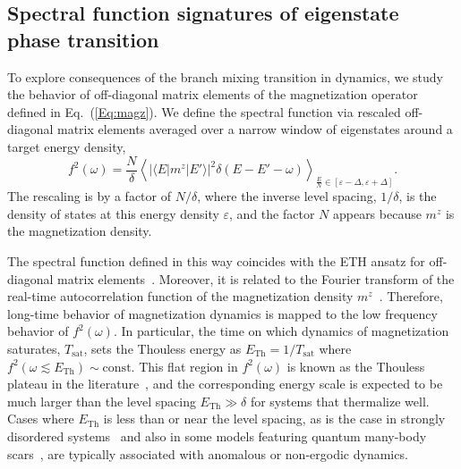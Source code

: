 \documentclass[aps,prx,showpacs,amsmath,amssymb,superscriptaddress,twocolumn,longbibliography,10pt,nofootinbib]{revtex4-2}
\begin{document}
\subsection{Spectral function signatures of eigenstate phase transition \label{Sec:spec}}
To explore consequences of the branch mixing transition in dynamics, we study the behavior of off-diagonal matrix elements of the magnetization operator defined in Eq.~(\ref{Eq:magz}). We define the spectral function via rescaled off-diagonal matrix elements averaged over a narrow window of eigenstates around a target energy density, 
\begin{equation}\label{Eq:f2-def}
f^2(\omega)= \frac{N}{\delta}\left\langle |\langle E|m^z|E'\rangle|^2 \delta(E-E'-\omega)\right\rangle_{\frac{E}{N} \in [\varepsilon-\Delta,\varepsilon+\Delta]}.
\end{equation}
The rescaling is by a factor of $N/\delta$, where the inverse level spacing, $1/\delta$, is  the density of states at this energy density $\varepsilon$, and the factor $N$ appears because $m^z$ is the magnetization density. 

The spectral function defined in this way coincides with the ETH ansatz for off-diagonal matrix elements~\cite{Srednicki99,Polkovnikov-rev}. Moreover, it is related to the  Fourier transform of the real-time autocorrelation function of the magnetization density $m^z$~\cite{Srednicki99,Polkovnikov-rev}. Therefore, long-time behavior of magnetization dynamics is mapped to the low frequency behavior of $f^2(\omega)$. In particular, the  time on which dynamics of magnetization saturates, $T_\text{sat}$, sets the Thouless energy as $E_\text{Th} = 1/T_\text{sat}$ where $f^2(\omega \lesssim E_\text{Th})\sim \text{const}$. This flat region in $f^2(\omega)$ is known as the Thouless plateau in the literature~\cite{Abanin17,GG16,Abanin21}, and the corresponding energy scale is expected to be much larger than the level spacing $E_\text{Th}\gg \delta$ for systems that thermalize well. Cases where $E_\text{Th}$ is less than or near the level spacing, as is the case in strongly disordered systems~\cite{Abanin17,Abanin21,Chalker21,Roy22}  and also in some models featuring quantum many-body scars~\cite{TurnerPRB}, are typically associated with anomalous or non-ergodic dynamics. 
\end{document}
